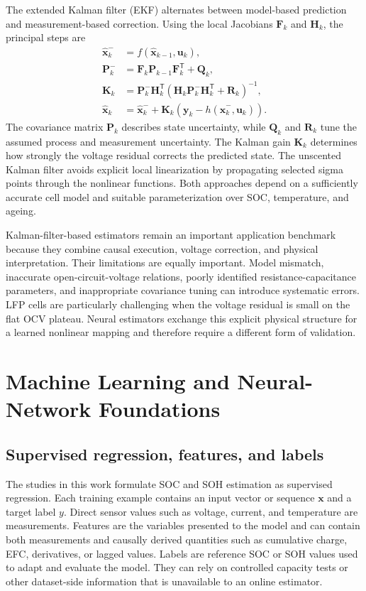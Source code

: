 \documentclass[
    a4paper,
    12pt,
    titlepage,
    bibliography=totoc,
    twoside=on,
    parskip=false,
    numbers=noenddot,
    cleardoublepage=empty,
    DIV=12,
    BCOR=12.0mm,
    headheight=36pt,
    headings=openright
]{scrreprt}
\begin{document}
The extended Kalman filter (EKF) alternates between model-based prediction and measurement-based correction. Using the local Jacobians $\mathbf{F}_k$ and $\mathbf{H}_k$, the principal steps are
\begin{align}
    \hat{\mathbf{x}}^-_k
    &=f(\hat{\mathbf{x}}_{k-1},\mathbf{u}_k), \\
    \mathbf{P}^-_k
    &=\mathbf{F}_k\mathbf{P}_{k-1}\mathbf{F}_k^\mathsf{T}+\mathbf{Q}_k, \\
    \mathbf{K}_k
    &=\mathbf{P}^-_k\mathbf{H}_k^\mathsf{T}
      \left(\mathbf{H}_k\mathbf{P}^-_k\mathbf{H}_k^\mathsf{T}+\mathbf{R}_k\right)^{-1}, \\
    \hat{\mathbf{x}}_k
    &=\hat{\mathbf{x}}^-_k
      +\mathbf{K}_k\left(\mathbf{y}_k-h(\hat{\mathbf{x}}^-_k,\mathbf{u}_k)\right).
    \label{eq:fundamental_ekf}
\end{align}
The covariance matrix $\mathbf{P}_k$ describes state uncertainty, while $\mathbf{Q}_k$ and $\mathbf{R}_k$ tune the assumed process and measurement uncertainty. The Kalman gain $\mathbf{K}_k$ determines how strongly the voltage residual corrects the predicted state. The unscented Kalman filter avoids explicit local linearization by propagating selected sigma points through the nonlinear functions. Both approaches depend on a sufficiently accurate cell model and suitable parameterization over SOC, temperature, and ageing.\autocite{liJointEstimationState2021,gaoEnhancedStateofchargeEstimation2022,guoSystematicReviewElectrochemical2024}

Kalman-filter-based estimators remain an important application benchmark because they combine causal execution, voltage correction, and physical interpretation. Their limitations are equally important. Model mismatch, inaccurate open-circuit-voltage relations, poorly identified resistance-capacitance parameters, and inappropriate covariance tuning can introduce systematic errors. LFP cells are particularly challenging when the voltage residual is small on the flat OCV plateau. Neural estimators exchange this explicit physical structure for a learned nonlinear mapping and therefore require a different form of validation.

\section{Machine Learning and Neural-Network Foundations}
\subsection{Supervised regression, features, and labels}
The studies in this work formulate SOC and SOH estimation as supervised regression. Each training example contains an input vector or sequence $\mathbf{x}$ and a target label $y$. Direct sensor values such as voltage, current, and temperature are measurements. Features are the variables presented to the model and can contain both measurements and causally derived quantities such as cumulative charge, EFC, derivatives, or lagged values. Labels are reference SOC or SOH values used to adapt and evaluate the model. They can rely on controlled capacity tests or other dataset-side information that is unavailable to an online estimator.
\end{document}
